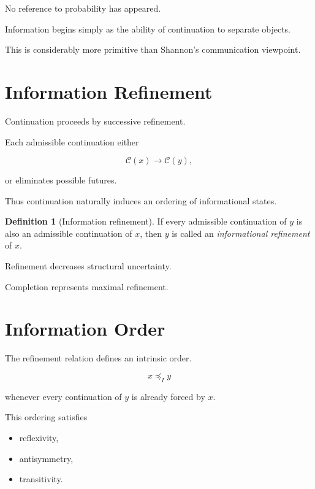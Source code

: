 \documentclass[13pt,openany]{book}
\theoremstyle{plain}
\theoremstyle{definition}
\newtheorem{definition}{Definition}[chapter]
\begin{document}
No reference to probability has appeared.

Information begins simply as the ability of continuation to separate objects.

This is considerably more primitive than Shannon's communication viewpoint.

\section{Information Refinement}

Continuation proceeds by successive refinement.

Each admissible continuation either

\[
\mathcal C(x)
\longrightarrow
\mathcal C(y),
\]

or eliminates possible futures.

Thus continuation naturally induces an ordering of informational states.

\begin{definition}[Information refinement]
If every admissible continuation of \(y\) is also an admissible continuation of
\(x\), then \(y\) is called an
\emph{informational refinement}
of \(x\).
\end{definition}

Refinement decreases structural uncertainty.

Completion represents maximal refinement.

\section{Information Order}

The refinement relation defines an intrinsic order.

\[
x
\preceq_I
y
\]

whenever every continuation of \(y\) is already forced by \(x\).

This ordering satisfies

\begin{itemize}
\item reflexivity,
\item antisymmetry,
\item transitivity.
\end{itemize}
\end{document}
